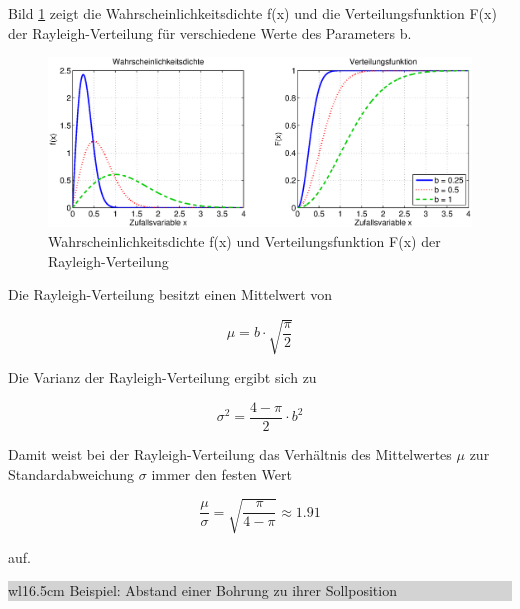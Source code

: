 \noindent Bild \ref{fig:Stetig_Rayleigh} zeigt die Wahrscheinlichkeitsdichte f(x) und die Verteilungsfunktion F(x) der Rayleigh-Verteilung f\"{u}r verschiedene Werte des Parameters b.

\begin{figure}[H]
  \centerline{\includegraphics[width=1\textwidth]{Kapitel4/Bilder/image32}}
  \caption{Wahrscheinlichkeitsdichte f(x) und Verteilungsfunktion F(x) der Rayleigh-Verteilung}
  \label{fig:Stetig_Rayleigh}
\end{figure}

\noindent Die Rayleigh-Verteilung besitzt einen Mittelwert von

\begin{equation}\label{eq:fourtwohundredthree}
\mu =b\cdot \sqrt{\dfrac{\pi }{2}}
\end{equation}

\noindent Die Varianz der Rayleigh-Verteilung ergibt sich zu

\begin{equation}\label{eq:fourtwohundredfour}
\sigma ^{2} =\dfrac{4-\pi }{2} \cdot b^{2}
\end{equation}

\noindent Damit weist bei der Rayleigh-Verteilung das Verh\"{a}ltnis des Mittelwertes $\mu$ zur Standardabweichung $\sigma$ immer den festen Wert

\begin{equation}\label{eq:fourtwohundredfive}
\dfrac{\mu }{\sigma } =\sqrt{\dfrac{\pi }{4-\pi } } \approx 1.91
\end{equation}

\noindent auf.\bigskip

\noindent
\colorbox{lightgray}{%
%
\renewcommand\arraystretch{0.6}%
\begin{tabular}{ wl{16.5cm} }
{\selectfont
\noindent
Beispiel: Abstand einer Bohrung zu ihrer Sollposition}
\end{tabular}%
}\bigskip

